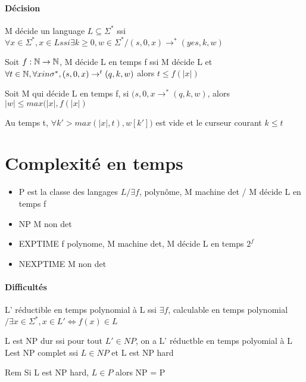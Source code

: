 \documentclass[10pt,a4paper]{article}
\begin{document}
\subsection{Décision} 

 \begin{definition}{}
M décide un language $L \subseteq \Sigma^*$ ssi $\forall x \in \Sigma^*, x \in L ssi \exists k \geq 0, w \in \Sigma^* / (s, 0, x) \rightarrow^* (yes, k, w)$\\
  \end{definition}

 \begin{definition}{}
 Soit $f : \mathbb{N} \rightarrow \mathbb{N}$, M décide L en temps f ssi M décide L et $\forall t \in \mathbb{N}, \forall x in \sigma^*, (s, 0, x) \rightarrow ^t (q, k, w)$ alors $t \leq f(|x|)$\\
 \end{definition}

\begin{prop}{}
 Soit M qui décide L en temps f, si $(s, 0, x \rightarrow^* (q, k, w)$, alors $|w| \leq max ( |x|, f(|x|)$
\end{prop}
 \begin{dem}{}
  Au temps t, $\forall k' > max ( |x|, t), w[k'] )$ est vide et le curseur courant $k \leq t$\\
 \end{dem}

 \part{Complexité en temps}
 
 \begin{definition}{}\begin{itemize}
 \item P est la classe des langages $L / \exists f$, polynôme, M machine det / M décide L en temps f
\item NP M non det
\item EXPTIME f polynome, M machine det, M décide L en temps $2^f$
 \item NEXPTIME M non det
 \end{itemize}
 \end{definition}


 \subsection{Difficultés}
 \begin{definition}{}L' réductible en temps polynomial à L ssi $\exists f$, calculable en temps polynomial $/ \exists x \in \Sigma ^*, x \in L' \Leftrightarrow f(x) \in L$
 \end{definition}
 \begin{definition}{}L est NP dur ssi pour tout $L' \in NP$, on a L' réductble en temps polyomial à L
 Lest NP complet ssi $L \in NP$ et L est NP hard
 \end{definition}
 Rem Si L est NP hard, $L \in P$ alors NP = P
 
\end{document}
